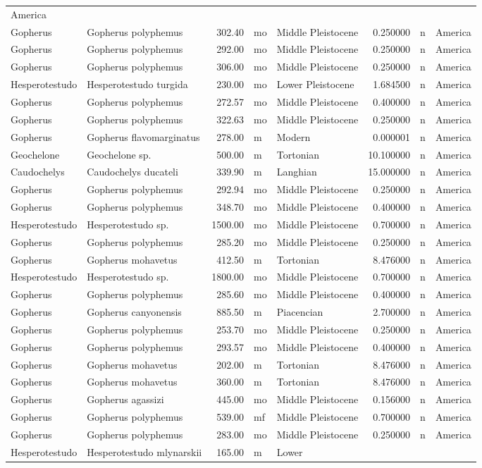 \begin{landscape}
\begin{longtable}[]{@{}llrllrll@{}}
	America\tabularnewline
	Gopherus & Gopherus polyphemus & 302.40 & mo & Middle Pleistocene &
	0.250000 & n & America\tabularnewline
	Gopherus & Gopherus polyphemus & 292.00 & mo & Middle Pleistocene &
	0.250000 & n & America\tabularnewline
	Gopherus & Gopherus polyphemus & 306.00 & mo & Middle Pleistocene &
	0.250000 & n & America\tabularnewline
	Hesperotestudo & Hesperotestudo turgida & 230.00 & mo & Lower
	Pleistocene & 1.684500 & n & America\tabularnewline
	Gopherus & Gopherus polyphemus & 272.57 & mo & Middle Pleistocene &
	0.400000 & n & America\tabularnewline
	Gopherus & Gopherus polyphemus & 322.63 & mo & Middle Pleistocene &
	0.250000 & n & America\tabularnewline
	Gopherus & Gopherus flavomarginatus & 278.00 & m & Modern & 0.000001 & n
	& America\tabularnewline
	Geochelone & Geochelone sp. & 500.00 & m & Tortonian & 10.100000 & n &
	America\tabularnewline
	Caudochelys & Caudochelys ducateli & 339.90 & m & Langhian & 15.000000 &
	n & America\tabularnewline
	Gopherus & Gopherus polyphemus & 292.94 & mo & Middle Pleistocene &
	0.250000 & n & America\tabularnewline
	Gopherus & Gopherus polyphemus & 348.70 & mo & Middle Pleistocene &
	0.400000 & n & America\tabularnewline
	Hesperotestudo & Hesperotestudo sp. & 1500.00 & mo & Middle Pleistocene
	& 0.700000 & n & America\tabularnewline
	Gopherus & Gopherus polyphemus & 285.20 & mo & Middle Pleistocene &
	0.250000 & n & America\tabularnewline
	Gopherus & Gopherus mohavetus & 412.50 & m & Tortonian & 8.476000 & n &
	America\tabularnewline
	Hesperotestudo & Hesperotestudo sp. & 1800.00 & mo & Middle Pleistocene
	& 0.700000 & n & America\tabularnewline
	Gopherus & Gopherus polyphemus & 285.60 & mo & Middle Pleistocene &
	0.400000 & n & America\tabularnewline
	Gopherus & Gopherus canyonensis & 885.50 & m & Piacencian & 2.700000 & n
	& America\tabularnewline
	Gopherus & Gopherus polyphemus & 253.70 & mo & Middle Pleistocene &
	0.250000 & n & America\tabularnewline
	Gopherus & Gopherus polyphemus & 293.57 & mo & Middle Pleistocene &
	0.400000 & n & America\tabularnewline
	Gopherus & Gopherus mohavetus & 202.00 & m & Tortonian & 8.476000 & n &
	America\tabularnewline
	Gopherus & Gopherus mohavetus & 360.00 & m & Tortonian & 8.476000 & n &
	America\tabularnewline
	Gopherus & Gopherus agassizi & 445.00 & mo & Middle Pleistocene &
	0.156000 & n & America\tabularnewline
	Gopherus & Gopherus polyphemus & 539.00 & mf & Middle Pleistocene &
	0.700000 & n & America\tabularnewline
	Gopherus & Gopherus polyphemus & 283.00 & mo & Middle Pleistocene &
	0.250000 & n & America\tabularnewline
	Hesperotestudo & Hesperotestudo mlynarskii & 165.00 & m & Lower

\end{longtable}
\end{landscape}
